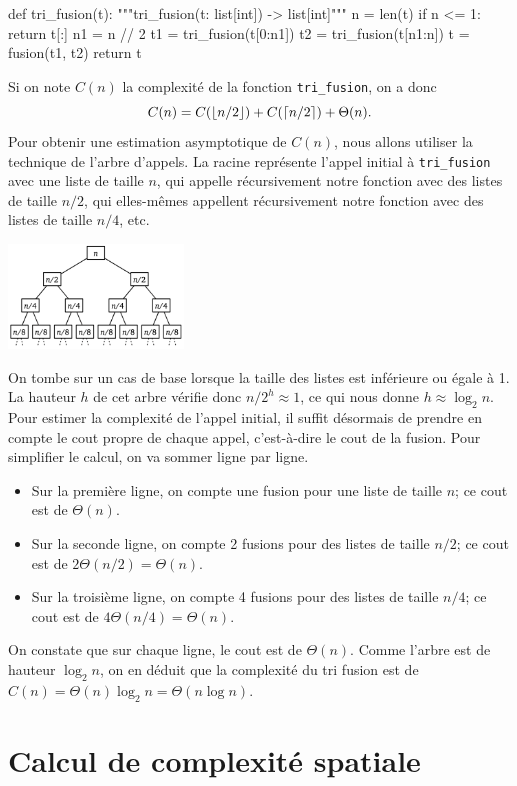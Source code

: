 \documentclass{magnolia}
\begin{document}
\begin{pythoncodeline}
def tri_fusion(t):
    """tri_fusion(t: list[int]) -> list[int]"""
    n = len(t)
    if n <= 1:
        return t[:]
    n1 = n // 2
    t1 = tri_fusion(t[0:n1])
    t2 = tri_fusion(t[n1:n])
    t = fusion(t1, t2)
    return t
\end{pythoncodeline}
Si on note $C(n)$ la complexité de la fonction \verb!tri_fusion!,
on a donc
\[C(n)=C(\left\lfloor n/2\right\rfloor) + C(\left\lceil n/2\right\rceil)+\Theta(n).\]
Pour obtenir une estimation asymptotique de $C(n)$, nous allons utiliser la technique
de l'arbre d'appels. La racine représente l'appel initial à \verb!tri_fusion! 
avec une liste de taille $n$, qui
appelle récursivement notre fonction avec des listes de taille $n/2$, qui elles-mêmes appellent
récursivement notre fonction avec des listes de taille $n/4$, etc. 
\begin{center}
\includegraphics[width=0.35\textwidth]{../../commun/images/python-cours-merge}
\end{center}
On tombe sur un cas de base lorsque la taille des listes est inférieure ou égale à 1.
La hauteur $h$ de cet arbre vérifie donc $n/2^h \approx 1$, ce qui nous donne
$h\approx \log_2 n$.
Pour estimer la complexité de l'appel initial, il suffit désormais de
prendre en compte le cout propre de chaque appel, c'est-à-dire le cout de la fusion. Pour
simplifier le calcul, on va sommer ligne par ligne.
\begin{itemize}
\item Sur la première ligne, on compte une fusion pour une liste de taille $n$; ce cout est de $\Theta(n)$.
\item Sur la seconde ligne,
on compte 2 fusions pour des listes de taille $n/2$; ce cout est de
$2\Theta(n/2)=\Theta(n)$.
\item Sur la troisième ligne, on compte 4 fusions pour des listes
de taille $n/4$; ce cout est de $4\Theta(n/4)=\Theta(n)$.
\end{itemize}
On constate que sur chaque
ligne, le cout est de $\Theta(n)$. Comme l'arbre est de hauteur $\log_2 n$, on en déduit
que la complexité du tri fusion est de $C(n)=\Theta(n)\log_2 n=\Theta(n\log n)$.

\section{Calcul de complexité spatiale}
\end{document}
